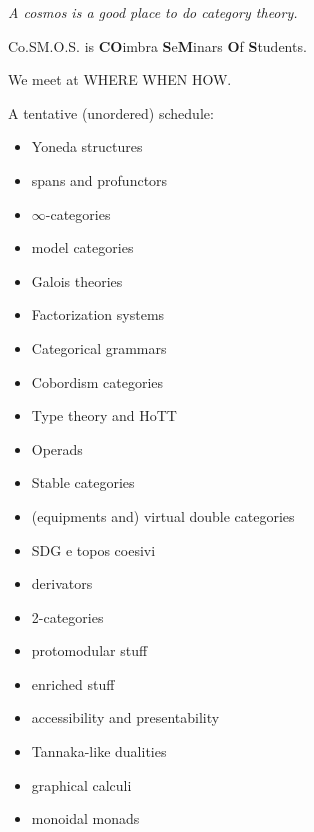 \documentclass{article}
\title{\cosmicLogo{3}}
\author{FL and LL}
\begin{document}
\maketitle
\begin{flushright}
  \emph{A cosmos is a good place to do category theory.}
\end{flushright}

\vspace{1cm}

Co.SM.O.S. is \textbf{CO}imbra \textbf{S}e\textbf{M}inars \textbf{O}f \textbf{S}tudents. 

We meet at WHERE WHEN HOW.

A tentative (unordered) schedule:
\begin{itemize}
  \item Yoneda structures
  \item spans and profunctors
  \item $\infty$-categories
  \item model categories
  \item Galois theories
  \item Factorization systems
  \item Categorical grammars
  \item Cobordism categories
  \item Type theory and HoTT
  \item Operads
  \item Stable categories
  \item (equipments and) virtual double categories
  \item SDG e topos coesivi
  \item derivators
  \item 2-categories
  \item protomodular stuff
  \item enriched stuff
  \item accessibility and presentability
  \item Tannaka-like dualities
  \item graphical calculi
  \item monoidal monads
\end{itemize}
\end{document}
